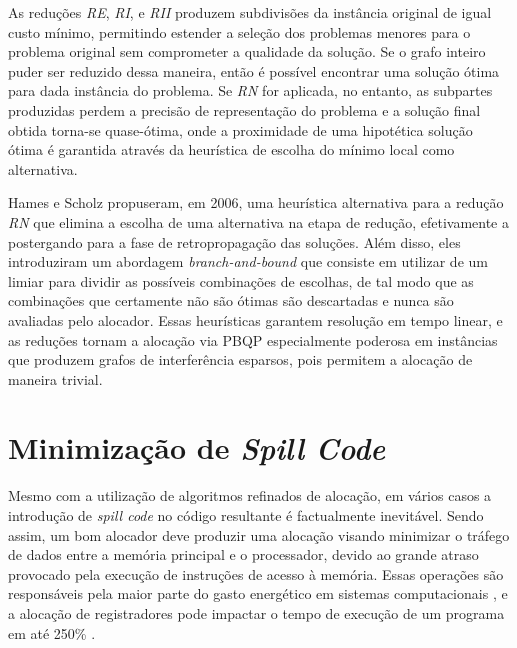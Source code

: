 \documentclass[
	12pt,				%
	openright,			%
	twoside,			%
	a4paper,			%
	tcc,			%
	]{ABNT-DC-UEL}
\begin{document}
\begin{enumerate}
\begin{figure}[H]
    \end{figure}
\end{enumerate}

As reduções \textit{RE}, \textit{RI}, e \textit{RII} produzem subdivisões da instância original de igual custo mínimo, permitindo estender a seleção dos problemas menores para o problema original sem comprometer a qualidade da solução. Se o grafo inteiro puder ser reduzido dessa maneira, então é possível encontrar uma solução ótima para dada instância do problema. Se \textit{RN} for aplicada, no entanto, as subpartes produzidas perdem a precisão de representação do problema e a solução final obtida torna-se quase-ótima, onde a proximidade de uma hipotética solução ótima é garantida através da heurística de escolha do mínimo local como alternativa.

Hames e Scholz \cite{hames:06} propuseram, em 2006, uma heurística alternativa para a redução \textit{RN} que elimina a escolha de uma alternativa na etapa de redução, efetivamente a postergando para a fase de retropropagação das soluções. Além disso, eles introduziram um abordagem \textit{branch-and-bound} que consiste em utilizar de um limiar para dividir as possíveis combinações de escolhas, de tal modo que as combinações que certamente não são ótimas são descartadas e nunca são avaliadas pelo alocador. Essas heurísticas garantem resolução em tempo linear, e as reduções tornam a alocação via PBQP especialmente poderosa em instâncias que produzem grafos de interferência esparsos, pois permitem a alocação de maneira trivial.

\chapter{Minimização de \textit{Spill Code}}

Mesmo com a utilização de algoritmos refinados de alocação, em vários casos a introdução de \textit{spill code} no código resultante é factualmente inevitável. Sendo assim, um bom alocador deve produzir uma alocação visando minimizar o tráfego de dados entre a memória principal e o processador, devido ao grande atraso provocado pela execução de instruções de acesso à memória. Essas operações são responsáveis pela maior parte do gasto energético em sistemas computacionais \cite{verma:06}, e a alocação de registradores pode impactar o tempo de execução de um programa em até 250\% \cite{pereira:08}.
\end{document}
